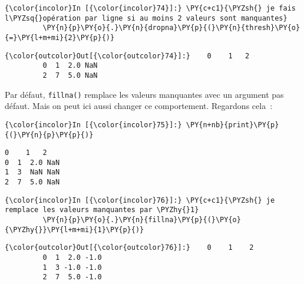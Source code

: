     \begin{Verbatim}[commandchars=\\\{\},frame=single,framerule=0.3mm,rulecolor=\color{cellframecolor}]
{\color{incolor}In [{\color{incolor}74}]:} \PY{c+c1}{\PYZsh{} je fais l\PYZsq{}opération par ligne si au moins 2 valeurs sont manquantes}
         \PY{n}{p}\PY{o}{.}\PY{n}{dropna}\PY{p}{(}\PY{n}{thresh}\PY{o}{=}\PY{l+m+mi}{2}\PY{p}{)}
\end{Verbatim}


\begin{Verbatim}[commandchars=\\\{\},frame=single,framerule=0.3mm,rulecolor=\color{cellframecolor}]
{\color{outcolor}Out[{\color{outcolor}74}]:}    0    1   2
         0  1  2.0 NaN
         2  7  5.0 NaN
\end{Verbatim}
            
    Par défaut, \texttt{fillna()} remplace les valeurs manquantes avec un
argument pas défaut. Mais on peut ici aussi changer ce comportement.
Regardons cela~:

    \begin{Verbatim}[commandchars=\\\{\},frame=single,framerule=0.3mm,rulecolor=\color{cellframecolor}]
{\color{incolor}In [{\color{incolor}75}]:} \PY{n+nb}{print}\PY{p}{(}\PY{n}{p}\PY{p}{)}
\end{Verbatim}


    \begin{Verbatim}[commandchars=\\\{\},frame=single,framerule=0.3mm,rulecolor=\color{cellframecolor}]
   0    1   2
0  1  2.0 NaN
1  3  NaN NaN
2  7  5.0 NaN
\end{Verbatim}

    \begin{Verbatim}[commandchars=\\\{\},frame=single,framerule=0.3mm,rulecolor=\color{cellframecolor}]
{\color{incolor}In [{\color{incolor}76}]:} \PY{c+c1}{\PYZsh{} je remplace les valeurs manquantes par \PYZhy{}1}
         \PY{n}{p}\PY{o}{.}\PY{n}{fillna}\PY{p}{(}\PY{o}{\PYZhy{}}\PY{l+m+mi}{1}\PY{p}{)}
\end{Verbatim}


\begin{Verbatim}[commandchars=\\\{\},frame=single,framerule=0.3mm,rulecolor=\color{cellframecolor}]
{\color{outcolor}Out[{\color{outcolor}76}]:}    0    1    2
         0  1  2.0 -1.0
         1  3 -1.0 -1.0
         2  7  5.0 -1.0
\end{Verbatim}
            
